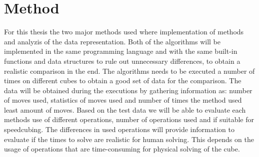 \documentclass[a4paper,11pt]{kth-mag}
\begin{document}
\chapter{Method}
For this thesis the two major methods used where implementation of methods and analyzis of the data representation.
Both of the algorithms will be implemented in the same programming language and with the same built-in functions and data structures to rule out unnecessary differences, to obtain a realistic comparison in the end.
The algorithms needs to be executed a number of times on different cubes to obtain a good set of data for the comparison. The data will be obtained during the executions by gathering information as: number of moves used, statistics of moves used and number of times the method used least amount of moves.  
Based on the test data we will be able to evaluate each methods use of different operations, number of operations used and if suitable for speedcubing. The differences in used operations will provide information to evaluate if the times to solve are realistic for human solving. This depends on the usage of operations that are time-consuming for physical solving of the cube. 
\end{document}
